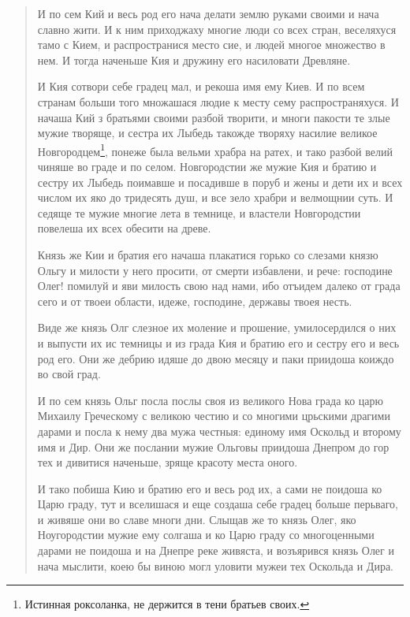 \begin{quotation}
И по сем Кий и весь род его нача делати землю руками своими и нача славно жити. И к ним приходжаху многие люди со всех стран, веселяхуся тамо с Кием, и распространися место сие, и людей многое множество в нем. И тогда наченьше Кия и дружину его насиловати Древляне. 

И Кия сотвори себе градец мал, и рекоша имя ему Киев. И по всем странам больши того множашася людие к месту сему распространяхуся. И начаша Кий з братьями своими разбой творити, и многи пакости те злые мужие творяще, и сестра их Лыбедь такожде творяху насилие великое Новгородцем\footnote{Истинная роксоланка, не держится в тени братьев своих.}, понеже была вельми храбра на ратех, и тако разбой велий чиняше во граде и по селом. Новгородстии же мужие Кия и братию и сестру их Лыбедь поимавше и посадивше в поруб и жены и дети их и всех числом их яко до тридесять душ, и все зело храбри и велмощнии суть. И седяще те мужие многие лета в темнице, и властели Новгородстии повелеша их всех обесити на древе.

Князь же Кии и братия его начаша плакатися горько со слезами князю Ольгу и милости у него просити, от смерти избавлени, и рече: господине Олег! помилуй и яви милость свою над нами, ибо отъидем далеко от града сего и от твоеи области, идеже, господине, державы твоея несть. 

Виде же князь Олг слезное их моление и прошение, умилосердился о них и выпусти их ис темницы и из града Кия и братию его и сестру его и весь род его. Они же дебрию идяше до двою месяцу и паки приидоша коиждо во свой град. 

И по сем князь Ольг посла послы своя из великого Нова града ко царю Михаилу Греческому с великою честию и со многими црьскими драгими дарами и посла к нему два мужа честныя: единому имя Оскольд и второму имя и Дир. Они же послании мужие Ольговы приидоша Днепром до гор тех и дивитися наченьше, зряще красоту места оного. 

И тако побиша Кию и братию его и весь род их, а сами не поидоша ко Царю граду, тут и вселишася и еще создаша себе градец больше перьваго, и живяше они во славе многи дни. Слыщав же то князь Олег, яко Ноугородстии мужие ему солгаша и ко Царю граду со многоценными дарами не поидоша и на Днепре реке живяста, и возъярився князь Олег и нача мыслити, коею бы виною могл уловити мужеи тех Оскольда и Дира. 


\end{quotation}
